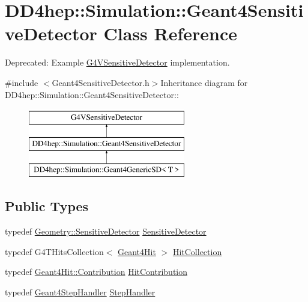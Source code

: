 \hypertarget{class_d_d4hep_1_1_simulation_1_1_geant4_sensitive_detector}{
\section{DD4hep::Simulation::Geant4SensitiveDetector Class Reference}
\label{class_d_d4hep_1_1_simulation_1_1_geant4_sensitive_detector}
}


Deprecated: Example \hyperlink{class_g4_v_sensitive_detector}{G4VSensitiveDetector} implementation.  


{\ttfamily \#include $<$Geant4SensitiveDetector.h$>$}Inheritance diagram for DD4hep::Simulation::Geant4SensitiveDetector::\begin{figure}[H]
\begin{center}
\leavevmode
\includegraphics[height=3cm]{class_d_d4hep_1_1_simulation_1_1_geant4_sensitive_detector}
\end{center}
\end{figure}
\subsection*{Public Types}
\begin{DoxyCompactItemize}
\item 
typedef \hyperlink{class_d_d4hep_1_1_geometry_1_1_sensitive_detector}{Geometry::SensitiveDetector} \hyperlink{class_d_d4hep_1_1_simulation_1_1_geant4_sensitive_detector_a6375f9a4f776b531e443483ff9fa8c28}{SensitiveDetector}
\item 
typedef G4THitsCollection$<$ \hyperlink{class_d_d4hep_1_1_simulation_1_1_geant4_hit}{Geant4Hit} $>$ \hyperlink{class_d_d4hep_1_1_simulation_1_1_geant4_sensitive_detector_a4865cf9c96edfef8cd41e309a4cd6211}{HitCollection}
\item 
typedef \hyperlink{struct_d_d4hep_1_1_simulation_1_1_geant4_hit_1_1_monte_carlo_contrib}{Geant4Hit::Contribution} \hyperlink{class_d_d4hep_1_1_simulation_1_1_geant4_sensitive_detector_a82e16b04c44370489f88b1e6a1ef2ab0}{HitContribution}
\item 
typedef \hyperlink{class_d_d4hep_1_1_simulation_1_1_geant4_step_handler}{Geant4StepHandler} \hyperlink{class_d_d4hep_1_1_simulation_1_1_geant4_sensitive_detector_ad8f31d0680aa437d6eb7242292e50a15}{StepHandler}
\end{DoxyCompactItemize}
